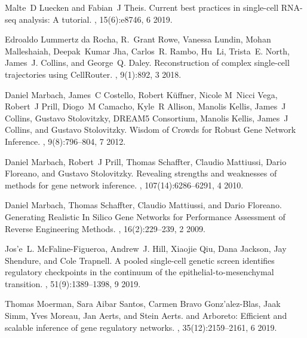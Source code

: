 \documentclass[10pt, a4paper]{article}
\begin{document}
\begin{thebibliography}{10}
	Malte~D Luecken and Fabian~J Theis.
	\newblock Current best practices in single-cell {{RNA}}-seq analysis: A
	tutorial.
	, 15(6):e8746, 6 2019.
	
	Edroaldo {Lummertz da Rocha}, R.~Grant Rowe, Vanessa Lundin, Mohan Malleshaiah,
	Deepak~Kumar Jha, Carlos~R. Rambo, Hu~Li, Trista~E. North, James~J. Collins,
	and George~Q. Daley.
	\newblock Reconstruction of complex single-cell trajectories using
	{{CellRouter}}.
	, 9(1):892, 3 2018.
	
	Daniel Marbach, James~C Costello, Robert K{\"u}ffner, Nicole M~Nicci Vega,
	Robert~J Prill, Diogo~M Camacho, Kyle~R Allison, Manolis Kellis, James~J
	Collins, Gustavo Stolovitzky, {DREAM5 Consortium}, Manolis Kellis, James~J
	Collins, and Gustavo Stolovitzky.
	\newblock Wisdom of {{Crowds}} for {{Robust Gene Network Inference}}.
	, 9(8):796--804, 7 2012.
	
	Daniel Marbach, Robert~J Prill, Thomas Schaffter, Claudio Mattiussi, Dario
	Floreano, and Gustavo Stolovitzky.
	\newblock Revealing strengths and weaknesses of methods for gene network
	inference.
	,
	107(14):6286--6291, 4 2010.
	
	Daniel Marbach, Thomas Schaffter, Claudio Mattiussi, and Dario Floreano.
	\newblock Generating {{Realistic In Silico Gene Networks}} for {{Performance
			Assessment}} of {{Reverse Engineering Methods}}.
	, 16(2):229--239, 2 2009.
	
	Jos{\a'e}~L. McFaline-Figueroa, Andrew~J. Hill, Xiaojie Qiu, Dana Jackson, Jay
	Shendure, and Cole Trapnell.
	\newblock A pooled single-cell genetic screen identifies regulatory checkpoints
	in the continuum of the epithelial-to-mesenchymal transition.
	, 51(9):1389--1398, 9 2019.
	
	Thomas Moerman, Sara {Aibar Santos}, Carmen {Bravo Gonz{\a'a}lez-Blas}, Jaak
	Simm, Yves Moreau, Jan Aerts, and Stein Aerts.
	 and {{Arboreto}}: Efficient and scalable inference of
	gene regulatory networks.
	, 35(12):2159--2161, 6 2019.
	

\end{thebibliography}
\end{document}
